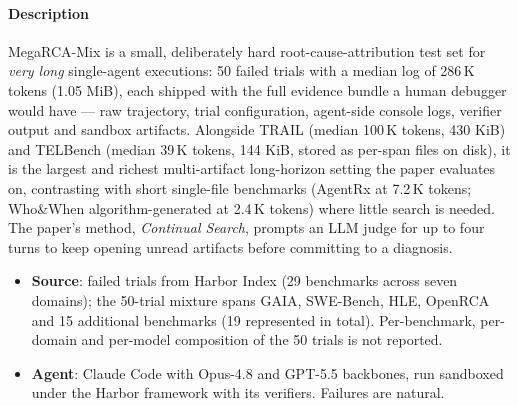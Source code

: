 \paragraph{Description} MegaRCA-Mix is a small, deliberately hard root-cause-attribution test set for \emph{very long} single-agent executions: 50 failed trials with a median log of 286\,K tokens (1.05 MiB), each shipped with the full evidence bundle a human debugger would have --- raw trajectory, trial configuration, agent-side console logs, verifier output and sandbox artifacts. Alongside TRAIL (median 100\,K tokens, 430 KiB) and TELBench (median 39\,K tokens, 144 KiB, stored as per-span files on disk), it is the largest and richest multi-artifact long-horizon setting the paper evaluates on, contrasting with short single-file benchmarks (AgentRx at 7.2\,K tokens; Who\&When algorithm-generated at 2.4\,K tokens) where little search is needed. The paper's method, \emph{Continual Search}, prompts an LLM judge for up to four turns to keep opening unread artifacts before committing to a diagnosis.
\begin{itemize}
\item \textbf{Source}: failed trials from Harbor Index (29 benchmarks across seven domains); the 50-trial mixture spans GAIA, SWE-Bench, HLE, OpenRCA and 15 additional benchmarks (19 represented in total). Per-benchmark, per-domain and per-model composition of the 50 trials is not reported.
\item \textbf{Agent}: Claude Code with Opus-4.8 and GPT-5.5 backbones, run sandboxed under the Harbor framework with its verifiers. Failures are natural.
\end{itemize}
